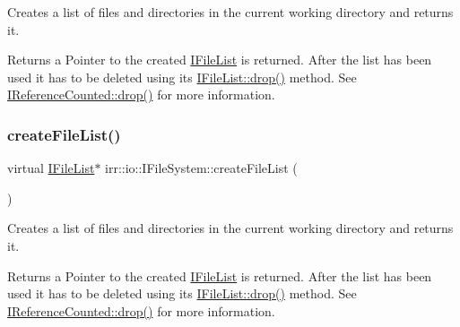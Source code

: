 Creates a list of files and directories in the current working directory and returns it. 

\begin{DoxyReturn}{Returns}
a Pointer to the created \hyperlink{classirr_1_1io_1_1IFileList}{I\+File\+List} is returned. After the list has been used it has to be deleted using its \hyperlink{classirr_1_1IReferenceCounted_a03856a09355b89d178090c4a5f738543}{I\+File\+List\+::drop()} method. See \hyperlink{classirr_1_1IReferenceCounted_a03856a09355b89d178090c4a5f738543}{I\+Reference\+Counted\+::drop()} for more information. 
\end{DoxyReturn}
\mbox{\label{classirr_1_1io_1_1IFileSystem_ad5820e7664377c12015ea7a6c801f7f8}} 
\subsubsection{\texorpdfstring{create\+File\+List()}{createFileList()}\hspace{0.1cm}{\footnotesize\ttfamily [2/2]}}
{\footnotesize\ttfamily virtual \hyperlink{classirr_1_1io_1_1IFileList}{I\+File\+List}$\ast$ irr\+::io\+::\+I\+File\+System\+::create\+File\+List (\begin{DoxyParamCaption}{ }\end{DoxyParamCaption})\hspace{0.3cm}{\ttfamily [pure virtual]}}



Creates a list of files and directories in the current working directory and returns it. 

\begin{DoxyReturn}{Returns}
a Pointer to the created \hyperlink{classirr_1_1io_1_1IFileList}{I\+File\+List} is returned. After the list has been used it has to be deleted using its \hyperlink{classirr_1_1IReferenceCounted_a03856a09355b89d178090c4a5f738543}{I\+File\+List\+::drop()} method. See \hyperlink{classirr_1_1IReferenceCounted_a03856a09355b89d178090c4a5f738543}{I\+Reference\+Counted\+::drop()} for more information. 
\end{DoxyReturn}
\mbox{\label{classirr_1_1io_1_1IFileSystem_a8b110f1ed6f52098753b7a558c020dbc}} 
